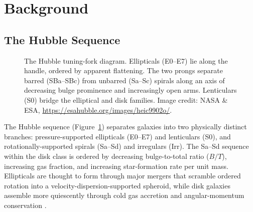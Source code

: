 \documentclass[10pt,preprint2]{aastex}
\begin{document}
\section{Background}
\label{sec:background}

\subsection{The Hubble Sequence}

\begin{figure}[t!]
  \centering
  
  \caption{The Hubble tuning-fork diagram. Ellipticals (E0--E7) lie along the handle, ordered by apparent flattening. The two prongs separate barred (SBa--SBc) from unbarred (Sa--Sc) spirals along an axis of decreasing bulge prominence and increasingly open arms. Lenticulars (S0) bridge the elliptical and disk families. Image credit: NASA \& ESA, \url{https://esahubble.org/images/heic9902o/}.}
  \label{fig:hubble_tuning_fork}
\end{figure}

The Hubble sequence (Figure~\ref{fig:hubble_tuning_fork}) separates galaxies into two physically distinct branches: pressure-supported ellipticals (E0--E7) and lenticulars (S0), and rotationally-supported spirals (Sa--Sd) and irregulars (Irr). The Sa--Sd sequence within the disk class is ordered by decreasing bulge-to-total ratio ($B/T$), increasing gas fraction, and increasing star-formation rate per unit mass. Ellipticals are thought to form through major mergers that scramble ordered rotation into a velocity-dispersion-supported spheroid, while disk galaxies assemble more quiescently through cold gas accretion and angular-momentum conservation \citep{Conselice2014}.

\end{document}
